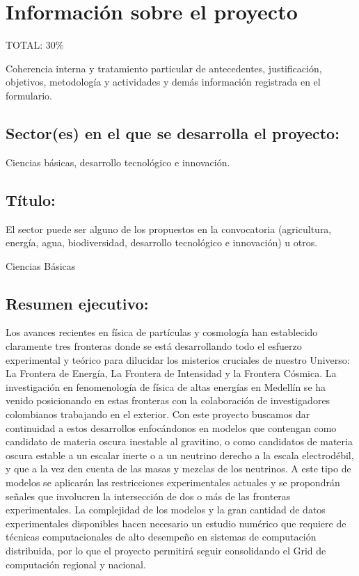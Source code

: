 
\section{Información sobre el proyecto}
\begin{evaluacion}
  TOTAL: 30\%

  Coherencia interna y tratamiento particular  de antecedentes,
  justificación, objetivos, metodología y actividades y demás
  información registrada en el formulario.
\end{evaluacion}

\subsection{Sector(es)  en el que se desarrolla el proyecto:}
Ciencias básicas, desarrollo tecnológico e innovación.
\subsection{Título:                                        }
\begin{instrucciones}
  El sector puede ser alguno de los propuestos en la convocatoria
  (agricultura, energía, agua, biodiversidad, desarrollo tecnológico e
  innovación) u otros.
\end{instrucciones}
Ciencias Básicas
\subsection{Resumen ejecutivo:                            }
Los avances recientes en física de partículas y cosmología han
establecido claramente tres fronteras donde se está desarrollando todo
el esfuerzo experimental y teórico para dilucidar los misterios cruciales de nuestro
Universo: La Frontera de Energía, La Frontera de Intensidad y la
Frontera Cósmica. La investigación en fenomenología de física de altas
energías en Medellín se ha venido posicionando en estas fronteras con
la colaboración de investigadores colombianos trabajando en el
exterior. Con este proyecto buscamos dar continuidad a estos
desarrollos enfocándonos en modelos que contengan como candidato de
materia oscura inestable al gravitino, o como candidatos de materia oscura
estable a un escalar inerte o a un neutrino derecho a la escala
electrodébil, y que a la vez den cuenta de las masas y mezclas de
los neutrinos. A este tipo de modelos se aplicarán las  restricciones
experimentales actuales y se propondrán señales que involucren la intersección
de dos o más de las fronteras experimentales. La complejidad de los
modelos y la gran cantidad de datos experimentales disponibles hacen
necesario un estudio numérico que requiere de técnicas computacionales
de alto desempeño en sistemas de computación distribuida, por lo que el
proyecto permitirá seguir consolidando el Grid de computación regional
y nacional.

